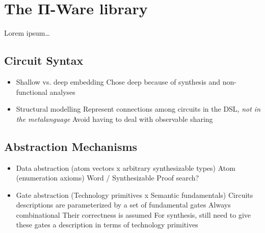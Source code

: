 \chapter{The Π-Ware library}
\label{chap:piware}
    Lorem ipsum\ldots


    \section{Circuit Syntax}
    \label{sec:circuit-types}
        \begin{itemize}
            \item Shallow vs. deep embedding
                \subitem Chose deep because of synthesis and non-functional analyses
            \item Structural modelling
                \subitem Represent connections among circuits in the DSL, \emph{not in the metalanguage}
                \subitem Avoid having to deal with observable sharing
        \end{itemize}

    \section{Abstraction Mechanisms}
    \label{sec:abstraction}
        \begin{itemize}
            \item Data abstraction (atom vectors x arbitrary synthesizable types)
                \subitem Atom (enumeration axioms)
                \subitem Word / Synthesizable
                    \subsubitem Proof search?
            \item Gate abstraction (Technology primitives x Semantic fundamentals)
                \subitem Circuits descriptions are parameterized by a set of fundamental gates
                    \subsubitem Always combinational
                    \subsubitem Their correctness is assumed
                \subitem For synthesis, still need to give these gates a description in terms of technology primitives
        \end{itemize}

